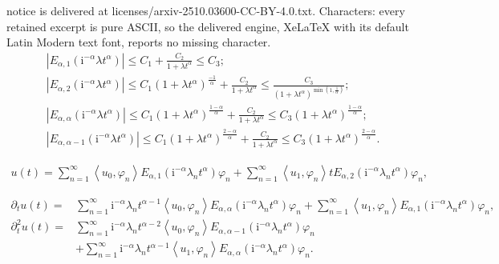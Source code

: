 \documentclass[10pt,a4paper]{amsart}
\begin{document}
notice is delivered at licenses/arxiv-2510.03600-CC-BY-4.0.txt. Characters: every retained excerpt is pure ASCII, so the delivered engine, XeLaTeX with its default Latin Modern text font, reports no missing character.
\begin{align}
& \left|E_{\alpha, 1}\left(\mathrm{i}^{-\alpha} \lambda t^\alpha\right)\right| \leq C_1+\frac{C_2}{1+\lambda t^\alpha} \leq C_3; \label{es1}\\
& \left|E_{\alpha, 2}\left(\mathrm{i}^{-\alpha} \lambda t^\alpha\right)\right| \leq C_1\left(1+\lambda t^\alpha\right)^{\frac{-1}{\alpha}}+\frac{C_2}{1+\lambda t^\alpha} \leq \frac{C_3}{\left(1+\lambda t^\alpha\right)^{\min(1,\frac{1}{\alpha})}}; \label{es2}\\
& \left|E_{\alpha, \alpha}\left(\mathrm{i}^{-\alpha} \lambda t^\alpha\right)\right| \leq C_1\left(1+\lambda t^\alpha\right)^{\frac{1-\alpha}{\alpha}}+\frac{C_2}{1+\lambda t^\alpha} \leq C_3\left(1+\lambda t^\alpha\right)^{\frac{1-\alpha}{\alpha}}; \label{es3}\\
& \left|E_{\alpha, \alpha-1}\left(\mathrm{i}^{-\alpha} \lambda t^\alpha\right)\right| \leq C_1\left(1+\lambda t^\alpha\right)^{\frac{2-\alpha}{\alpha}}+\frac{C_2}{1+\lambda t^\alpha} \leq C_3\left(1+\lambda t^\alpha\right)^{\frac{2-\alpha}{\alpha}}. \label{es4}
\end{align}

	\begin{align}\label{solution formula3}
        u(t)=\sum_{n=1}^{\infty}\left\langle u_0, \varphi_n\right\rangle E_{\alpha, 1}\left(\mathrm{i}^{-\alpha}\lambda_n t^\alpha\right) \varphi_n + \sum_{n=1}^{\infty}\left\langle u_1, \varphi_n\right\rangle tE_{\alpha, 2}\left(\mathrm{i}^{-\alpha}\lambda_n t^\alpha\right) \varphi_n,
	\end{align}

\begin{align}
	\partial_t u(t)=&\sum_{n=1}^{\infty}\mathrm{i}^{-\alpha}\lambda_n t^{\alpha-1}\left\langle u_0, \varphi_n\right\rangle E_{\alpha, \alpha}\left(\mathrm{i}^{-\alpha}\lambda_n t^\alpha\right) \varphi_n+ \sum_{n=1}^{\infty}\left\langle u_1, \varphi_n\right\rangle E_{\alpha, 1}\left(\mathrm{i}^{-\alpha}\lambda_n t^\alpha\right) \varphi_n, \label{D2}\\
	\partial_t^2 u(t)=&\sum_{n=1}^{\infty}\mathrm{i}^{-\alpha}\lambda_n t^{\alpha-2}\left\langle u_0, \varphi_n\right\rangle E_{\alpha, \alpha-1}\left(\mathrm{i}^{-\alpha}\lambda_n t^\alpha\right) \varphi_n \nonumber\\
    &+\sum_{n=1}^{\infty}\mathrm{i}^{-\alpha}\lambda_n t^{\alpha-1}\left\langle u_1, \varphi_n\right\rangle E_{\alpha, \alpha}\left(\mathrm{i}^{-\alpha}\lambda_n t^\alpha\right) \varphi_n. \label{D3}
\end{align}
\end{document}
